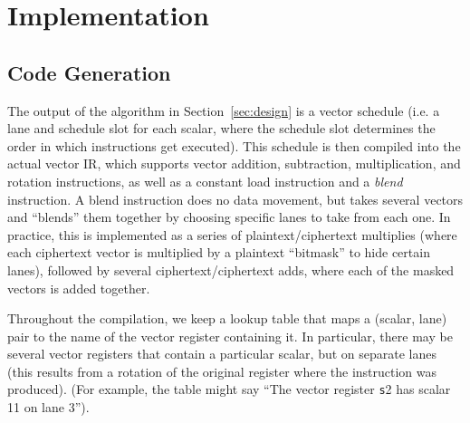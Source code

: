 \section{Implementation}\label{sec:implementation}


\subsection{Code Generation}\label{sec:codegen}
The output of the algorithm in Section~\ref{sec:design} is a vector schedule (i.e. a lane and schedule slot for each scalar, where the schedule slot determines the order in which instructions get executed).
This schedule is then compiled into the actual vector IR, which supports vector addition, subtraction, multiplication, and rotation instructions, as well as a constant load instruction and a {\em blend} instruction.
A blend instruction does no data movement, but takes several vectors and ``blends'' them together by choosing specific lanes to take from each one.
In practice, this is implemented as a series of plaintext/ciphertext multiplies (where each ciphertext vector is multiplied by a plaintext ``bitmask'' to hide certain lanes), followed by several ciphertext/ciphertext adds, where each of the masked vectors is added together.

Throughout the compilation, we keep a lookup table that maps a (scalar, lane) pair to the name of the vector register containing it.
In particular, there may be several vector registers that contain a particular scalar, but on separate lanes (this results from a rotation of the original register where the instruction was produced).
(For example, the table might say ``The vector register {\texttt s2} has scalar 11 on lane 3'').


